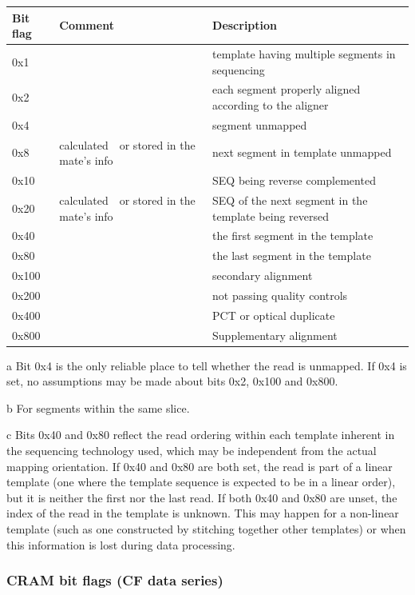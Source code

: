 \documentclass[a4paper]{article}
\begin{document}
\begin{threeparttable}[t]
\begin{tabular}{|>{\raggedright}p{144pt}|>{\raggedright}p{144pt}|>{\raggedright}p{144pt}|}
\hline
\textbf{Bit flag} & \textbf{Comment} & \textbf{Description}\tabularnewline
\hline
0x1 &  & template having multiple segments in sequencing\tabularnewline
\hline
0x2 &  & each segment properly aligned according to the aligner\tabularnewline
\hline
0x4 &  & segment unmapped\tnote{a}\tabularnewline
\hline
0x8 & calculated\tnote{b}\ \ or stored in the mate's info & next segment in template unmapped\tabularnewline
\hline
0x10 &  & SEQ being reverse complemented\tabularnewline
\hline
0x20 & calculated\tnote{b}\ \ or stored in the mate's info & SEQ of the next segment in the
template being reversed\tabularnewline
\hline
0x40 &  & the first segment in the template\tnote{c}\tabularnewline
\hline
0x80 &  & the last segment in the template\tnote{c}\tabularnewline
\hline
0x100 &  & secondary alignment\tabularnewline
\hline
0x200 &  & not passing quality controls\tabularnewline
\hline
0x400 &  & PCT or optical duplicate\tabularnewline
\hline
0x800 &  & Supplementary alignment\tabularnewline
\hline
\end{tabular}
\begin{tablenotes}
\item[a] Bit 0x4 is the only reliable place to tell whether the read is unmapped.  If 0x4 is set, no assumptions may be made about bits 0x2, 0x100 and 0x800.
\item[b] For segments within the same slice.
\item[c] Bits 0x40 and 0x80 reflect the read ordering within each template inherent in the sequencing technology used, which may be independent from the actual mapping orientation.
If 0x40 and 0x80 are both set, the read is part of a linear template (one where the template sequence is expected to be in a linear order), but it is neither the first nor the last read.
If both 0x40 and 0x80 are unset, the index of the read in the template is unknown.
This may happen for a non-linear template (such as one constructed by stitching together other templates) or when this information is lost during data processing.
\end{tablenotes}
\end{threeparttable}

\subsubsection*{\textbf{CRAM bit flags (CF data series)}}
\end{document}

